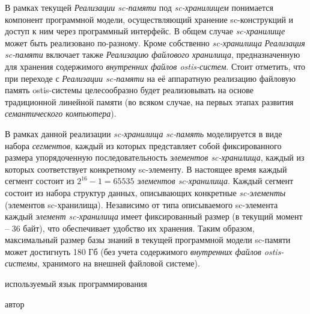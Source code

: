 В рамках текущей \textit{Реализации sc-памяти} под \textit{sc-хранилищем} понимается компонент программной
модели, осуществляющий хранение sc-конструкций и доступ к ним через программный интерфейс. В общем случае
\textit{sc-хранилище} может быть реализовано по-разному. Кроме собственно \textit{sc-хранилища}
\textit{Реализация sc-памяти} включает также \textit{Реализацию файлового хранилища},
предназначенную для хранения содержимого \textit{внутренних файлов ostis-систем}. Стоит отметить, что при переходе с
\textit{Реализации sc-памяти} на её аппаратную реализацию файловую память ostis-системы целесообразно будет
реализовывать на основе традиционной линейной памяти (во всяком случае, на первых этапах развития
\textit{семантического компьютера}).

В рамках данной реализации \textit{sc-хранилища} \textit{sc-память} моделируется в виде набора \textit{сегментов},
каждый из которых представляет собой фиксированного размера упорядоченную последовательность \textit{элементов sc-хранилища},
каждый из которых соответствует конкретному sc-элементу. В настоящее время каждый сегмент состоит из $2^{16}-1=65535$
\textit{элементов sc-хранилища}. Каждый сегмент состоит из набора структур данных, описывающих конкретные
\textit{sc-элементы} (элементов sc-хранилища). Независимо от типа описываемого sc-элемента каждый \textit{элемент sc-хранилища}
имеет фиксированный размер (в текущий момент -- 36 байт), что обеспечивает удобство их хранения. Таким образом,
максимальный размер базы знаний в текущей программной модели sc-памяти может достигнуть 180 Гб (без учета содержимого
\textit{внутренних файлов ostis-системы}, хранимого на внешней файловой системе).


\begin{SCn}
\begin{scnindent}
    \begin{scnindent}
    \end{scnindent}
\end{scnindent}
\begin{scnrelfromlist}{используемый язык программирования}
\end{scnrelfromlist}
\begin{scnrelfromlist}{автор}
\end{scnrelfromlist}
\end{SCn}

